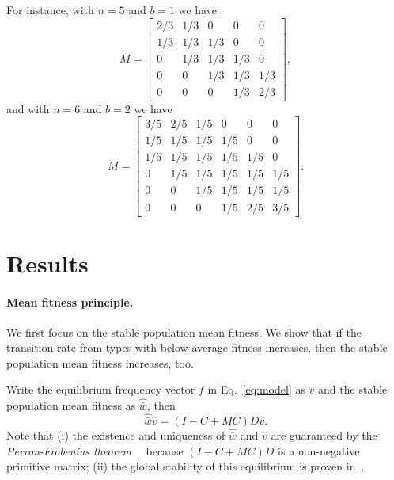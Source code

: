 \documentclass[12pt, twocolumn]{extarticle}
\begin{document}
For instance, with $n=5$ and $b=1$ we have
\begin{equation}
M = \begin{bmatrix}
2/3 & 1/3 & 0 & 0 & 0 \\
1/3 & 1/3 & 1/3 & 0 & 0 \\
0 & 1/3 & 1/3 & 1/3 & 0 \\
0 & 0 & 1/3 & 1/3 & 1/3 \\
0 & 0 & 0 & 1/3 & 2/3
\end{bmatrix},
\end{equation}
and with $n=6$ and $b=2$ we have
\begin{equation}
M = \begin{bmatrix}
3/5 & 2/5 & 1/5 & 0 & 0 & 0 \\
1/5 & 1/5 & 1/5 & 1/5 & 0 & 0 \\
1/5 & 1/5 & 1/5 & 1/5 & 1/5 & 0 \\
0 & 1/5 & 1/5 & 1/5 & 1/5 & 1/5 \\
0 & 0 & 1/5 & 1/5 & 1/5 & 1/5 \\
0 & 0 & 0 & 1/5 & 2/5 & 3/5
\end{bmatrix}.
\end{equation}

\section*{Results}

\paragraph*{Mean fitness principle.}

We first focus on the stable population mean fitness.
We  show that if the transition rate from types with below-average fitness increases, then the stable population mean fitness increases, too.

Write the equilibrium  frequency vector $f$ in Eq.~\ref{eq:model} as $\hat v$ and the stable population mean fitness as $\hat{\bar w}$, then
\begin{equation}\label{eq:model_equilibrium}
\hat{\bar w} \hat v = (I-C+MC)D \hat v.
\end{equation}
Note that (i) the existence and uniqueness of $\hat{\bar w}$ and $\hat v$ are guaranteed by the \emph{Perron-Frobenius theorem}~~\citep[][Appendix 3]{Otto2007} because $(I-C+MC)D$ is a non-negative primitive matrix; 
(ii) the global stability of this equilibrium is proven in~.
\end{document}
